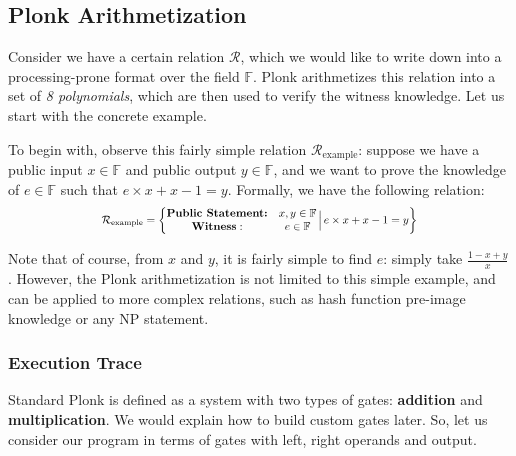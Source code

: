 \documentclass[../lecture-notes.tex]{subfiles}
\begin{document}
\subsection{Plonk Arithmetization}

Consider we have a certain relation $\mathcal{R}$, which we would like to write
down into a processing-prone format over the field $\mathbb{F}$. Plonk arithmetizes this relation into a set
of \textit{8 polynomials}, which are then used to verify the witness knowledge. Let us 
start with the concrete example.

\begin{example}
To begin with, observe this fairly simple relation
$\mathcal{R}_{\text{example}}$: suppose we have a public input $x \in
\mathbb{F}$ and public output $y \in \mathbb{F}$, and we want to prove the knowledge of $e \in
\mathbb{F}$ such that $e \times x + x - 1 = y$. Formally, we have the following relation:
\begin{equation*}
    \scalebox{0.8}{$
    \begin{aligned}    
        \mathcal{R}_{\text{example}} = \left\{ \begin{matrix}
            \textbf{Public Statement:} & x, y \in \mathbb{F} \\
            \textbf{Witness}: & e \in \mathbb{F}
        \end{matrix} \, \Big| \, e \times x + x - 1 = y \right\}
    \end{aligned}
    $}
\end{equation*}

\end{example}

\begin{remark}
    Note that of course, from $x$ and $y$, it is fairly simple to find $e$: simply take $\frac{1 - x + y}{x}$. However, the Plonk arithmetization 
    is not limited to this simple example, and can be applied to more complex relations, such as hash function pre-image knowledge or any NP statement.
\end{remark}

\subsubsection{Execution Trace}

Standard Plonk is defined as a system with two types of gates: \textbf{addition}
and \textbf{multiplication}. We would explain how to build custom gates later.
So, let us consider our program in terms of gates with left, right operands and
output. 
\end{document}
